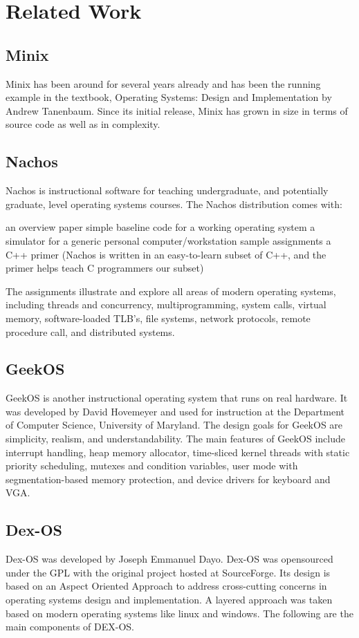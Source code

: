 \documentclass{acm_proc_article-sp}
\begin{document}
\section{Related Work}

\subsection{Minix}
Minix has been around for several years already and has been the running 
example in the textbook, Operating Systems: Design and Implementation by 
Andrew Tanenbaum. Since its initial release, Minix has grown in size in terms
of source code as well as in complexity. 

\subsection{Nachos}
Nachos is instructional software for teaching undergraduate, and potentially
graduate, level operating systems courses. The Nachos distribution
comes with: 

   an overview paper
   simple baseline code for a working operating system
   a simulator for a generic personal computer/workstation
   sample assignments
   a C++ primer (Nachos is written in an easy-to-learn subset of C++, 
     and the primer helps teach C programmers our subset)

The assignments illustrate and explore all areas of modern operating
systems, including threads and concurrency, multiprogramming, 
system calls, virtual memory, software-loaded TLB's, file systems, 
network protocols, remote procedure call, and distributed systems.


\subsection{GeekOS}

GeekOS is another instructional operating system that runs on real hardware. 
It was developed by David Hovemeyer and used for instruction at the Department 
of Computer Science, University of Maryland. The design goals for GeekOS are
simplicity, realism, and understandability. The main features of GeekOS include interrupt handling, heap memory allocator, time-sliced kernel threads with 
static priority scheduling, mutexes and condition variables, user mode 
with segmentation-based memory protection, and device drivers for keyboard 
and VGA.


\subsection{Dex-OS}
Dex-OS was developed by Joseph Emmanuel Dayo. Dex-OS was opensourced under 
the GPL with the original project hosted at SourceForge. Its design is based on
an Aspect Oriented Approach to address cross-cutting concerns in operating 
systems design and implementation. A layered approach was taken based on 
modern operating systems like linux and windows. The following are the main
components of DEX-OS.
\end{document}
